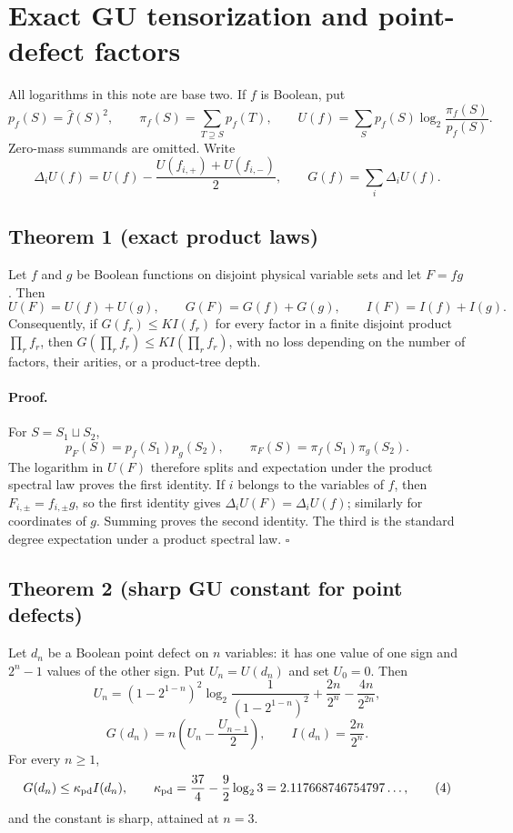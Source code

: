 \section*{Exact GU tensorization and point-defect factors}

All logarithms in this note are base two.  If $f$ is Boolean, put
\[
 p_f(S)=\widehat f(S)^2,
 \qquad \pi_f(S)=\sum_{T\supseteq S}p_f(T),
 \qquad U(f)=\sum_Sp_f(S)\log_2\frac{\pi_f(S)}{p_f(S)}.
\]
Zero-mass summands are omitted.  Write
\[
 \Delta_iU(f)=U(f)-\frac{U(f_{i,+})+U(f_{i,-})}{2},
 \qquad G(f)=\sum_i\Delta_iU(f).
\]

\subsection*{Theorem 1 (exact product laws)}

Let $f$ and $g$ be Boolean functions on disjoint physical variable sets and
let $F=fg$.  Then
\[
 U(F)=U(f)+U(g),\qquad G(F)=G(f)+G(g),\qquad I(F)=I(f)+I(g).
\tag{1}
\]
Consequently, if $G(f_r)\le K I(f_r)$ for every factor in a finite disjoint
product $\prod_r f_r$, then $G(\prod_r f_r)\le K I(\prod_r f_r)$, with no
loss depending on the number of factors, their arities, or a product-tree
depth.

\paragraph{Proof.}
For $S=S_1\sqcup S_2$,
\[
 p_F(S)=p_f(S_1)p_g(S_2),\qquad
 \pi_F(S)=\pi_f(S_1)\pi_g(S_2).
\]
The logarithm in $U(F)$ therefore splits and expectation under the product
spectral law proves the first identity.  If $i$ belongs to the variables of
$f$, then $F_{i,\pm}=f_{i,\pm}g$, so the first identity gives
$\Delta_iU(F)=\Delta_iU(f)$; similarly for coordinates of $g$.  Summing
proves the second identity.  The third is the standard degree expectation
under a product spectral law. \(\square\)

\subsection*{Theorem 2 (sharp GU constant for point defects)}

Let $d_n$ be a Boolean point defect on $n$ variables: it has one value of
one sign and $2^n-1$ values of the other sign.  Put $U_n=U(d_n)$ and set
$U_0=0$.  Then
\[
 U_n=(1-2^{1-n})^2\log_2\frac1{(1-2^{1-n})^2}
       +\frac{2n}{2^n}-\frac{4n}{2^{2n}},
\tag{2}
\]
\[
 G(d_n)=n\left(U_n-\frac{U_{n-1}}2\right),
 \qquad I(d_n)=\frac{2n}{2^n}.
\tag{3}
\]
For every $n\ge1$,
\[
 G(d_n)\le \kappa_{\rm pd} I(d_n),
 \qquad
 \kappa_{\rm pd}=\frac{37}{4}-\frac92\log_2 3
 =2.117668746754797\ldots,
\tag{4}
\]
and the constant is sharp, attained at $n=3$.

